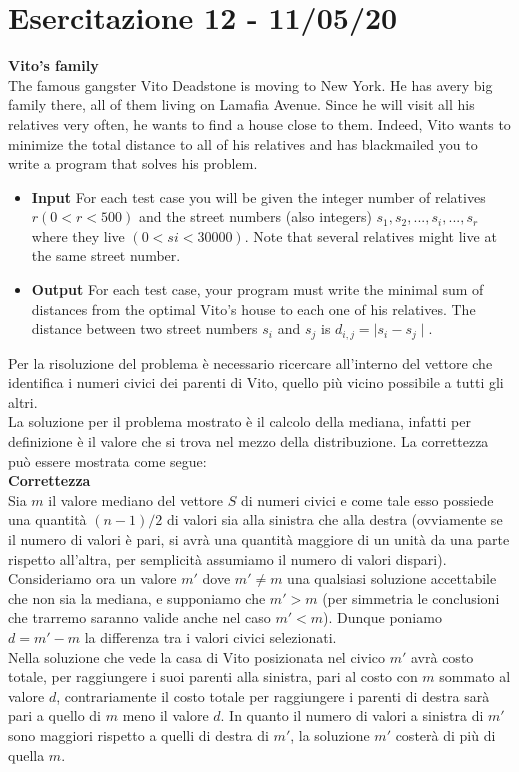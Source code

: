 \documentclass[../cheatSheetAlgoritmi.tex]{subfiles}
\begin{document}
\section{Esercitazione 12 - 11/05/20}
\textbf{Vito's family} \\
The famous gangster Vito Deadstone is moving to New York. He has avery big family there, all of them living on Lamafia Avenue. Since he will visit all his relatives very often, he wants to find a house close to them. Indeed, Vito wants to minimize the total distance to all of his relatives and has blackmailed you to write a program that solves his problem.
\begin{itemize}
	\item \textbf{Input} For each test case you will be given the integer number of relatives $r(0 < r < 500)$ and the street numbers (also integers) $s_1, s_2, ..., s_i, ..., s_r$ where they live $(0< si<30000)$. Note that several relatives might live at the same street number.
	\item \textbf{Output} For each test case, your program must write the minimal sum of distances from the optimal Vito's house to each one of his relatives. The distance between two street numbers $s_i$ and $s_j$ is $d_{i,j}= \mid s_{i} - s_{j} \mid$.
\end{itemize}
Per la risoluzione del problema è necessario ricercare all'interno del vettore che identifica i numeri civici dei parenti di Vito, quello più vicino possibile a tutti gli altri. \\ 
La soluzione per il problema mostrato è il calcolo della mediana, infatti per definizione è il valore che si trova nel mezzo della distribuzione. La correttezza può essere mostrata come segue: \\
\textbf{Correttezza} \\
Sia $m$ il valore mediano del vettore $S$ di numeri civici e come tale esso possiede una quantità $(n - 1)/2$ di valori sia alla sinistra che alla destra (ovviamente se il numero di valori è pari, si avrà una quantità maggiore di un unità da una parte rispetto all'altra, per semplicità assumiamo il numero di valori dispari). \\
Consideriamo ora un valore $m'$ dove $m' \neq m$ una qualsiasi soluzione accettabile che non sia la mediana, e supponiamo che $m' > m$ (per simmetria le conclusioni che trarremo saranno valide anche nel caso $m' < m$). Dunque poniamo $d = m' - m$ la differenza tra i valori civici selezionati. \\
Nella soluzione che vede la casa di Vito posizionata nel civico $m'$ avrà costo totale, per raggiungere i suoi parenti alla sinistra, pari al costo con $m$ sommato al valore $d$, contrariamente il costo totale per raggiungere i parenti di destra sarà pari a quello di $m$ meno il valore $d$. In quanto il numero di valori a sinistra di $m'$  sono maggiori rispetto a quelli di destra di $m'$, la soluzione $m'$ costerà di più di quella $m$. \\
\end{document}
